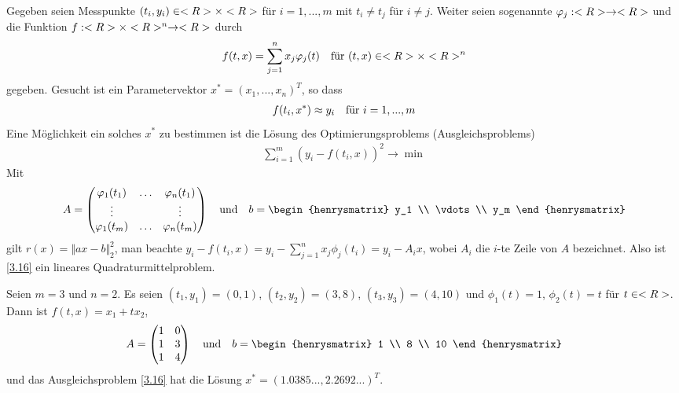 Gegeben seien Messpunkte $(t_i,y_i)\in<R>\times<R>$ für $i=1,...,m$ mit $t_i\neq t_j$ für $i\neq j$. Weiter seien sogenannte  $\varphi_j:<R>\to<R>$ und die Funktion $f:<R>\times<R>^n\to<R>$ durch
\begin{align}
	f(t,x) = \sum_{j=1}^{n} x_j\varphi_j(t)\quad\text{für } (t,x)\in<R>\times<R>^n\notag
\end{align}
gegeben. Gesucht ist ein  Parametervektor $x^\ast=(x_1,...,x_n)^T$, so dass
\begin{align}
	f(t_i,x^\ast) \approx y_i\quad\text{für } i=1,...,m\notag
\end{align}
Eine Möglichkeit ein solches $x^\ast$ zu bestimmen ist die Lösung des Optimierungsproblems (Ausgleichsproblems)
\begin{align}
	\label{3.16}
	\sum_{i=1}^{m} (y_i - f(t_i,x))^2\to\min
\end{align}
Mit 
\begin{align}
	A = \begin{pmatrix}
		\phi_1(t_1) & \dots & \phi_n(t_1) \\
		\vdots && \vdots \\
		\phi_1(t_m) & \dots & \phi_n(t_m)
	\end{pmatrix} \quad\text{und}\quad b= \begin{henrysmatrix}
		y_1 \\ \vdots  \\  y_m
	\end{henrysmatrix}\notag
\end{align}
gilt $r(x)=\Vert ax-b\Vert_2^2$, man beachte $y_i-f(t_i,x)=y_i-\sum_{j=1}^n x_j\phi_j(t_i)=y_i-A_ix$, wobei $A_i$ die $i$-te Zeile von $A$ bezeichnet. Also ist \cref{3.16} ein lineares Quadraturmittelproblem.

\begin{example}[Ausgleichsgerade]
	Seien $m=3$ und $n=2$. Es seien $(t_1,y_1)=(0,1)$, $(t_2,y_2)=(3,8)$, $(t_3,y_3)=(4,10)$ und $\phi_1(t)=1$, $\phi_2(t)=t$ für $t\in<R>$. Dann ist $f(t,x)=x_1+tx_2$, 
	\begin{align}
		A = \begin{pmatrix}
			1 & 0 \\ 1 & 3 \\ 1 & 4
		\end{pmatrix}\quad\text{und}\quad b = \begin{henrysmatrix}
			1 \\ 8 \\ 10
		\end{henrysmatrix} \notag
	\end{align}
	und das Ausgleichsproblem \cref{3.16} hat die Lösung $x^\ast=(1.0385..., 2.2692...)^T$.
\end{example}
